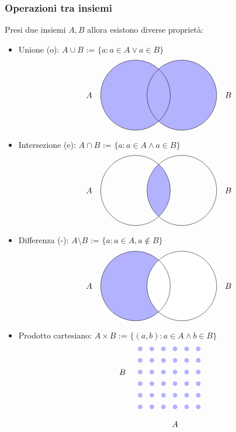 \documentclass[a4paper,12pt]{article}
\begin{document}
	\subsubsection{Operazioni tra insiemi}	
	Presi due insiemi $A, B$ allora esistono diverse proprietà:
	\begin{itemize}
		\item Unione (o): $A \cup B$ := $\{a : a\in A \vee a \in B\}$
		\[
		\begin{tikzpicture}
			
			\begin{scope}
				\clip (0,0) circle (1.5cm);
				\fill[blue!30] (-2,-2) rectangle (4,2);
			\end{scope}
			
			\begin{scope}
				\clip (2,0) circle (1.5cm);
				\fill[blue!30] (-2,-2) rectangle (4,2);
			\end{scope}
			
			\draw (0,0) circle (1.5cm);
			\node at (-2,0) {$A$};
			\draw (2,0) circle (1.5cm);
			\node at (4,0) {$B$};
		\end{tikzpicture}
		\]
		\item Intersezione (e): $A \cap B$ := $\{a : a\in A \wedge a \in B\}$ 
		\[
		\begin{tikzpicture}
			\begin{scope}
				\clip (0,0) circle (1.5cm);
				\fill[blue!30] (2,0) circle (1.5cm);
			\end{scope}
			
			\draw (0,0) circle (1.5cm);
			\node at (-2,0) {$A$};
			\draw (2,0) circle (1.5cm);
			\node at (4,0) {$B$};		
		\end{tikzpicture}
		\]
		\item Differenza (-): $A \setminus B $ :=  $\{a : a \in A, a\not \in B\}$
		\[
		\begin{tikzpicture}
			\begin{scope}
				\clip (0,0) circle (1.5cm);
				\fill[blue!30] (-2,-2) rectangle (2,2);
			\end{scope}
			
			\begin{scope}
				\clip (2,0) circle (1.5cm);
				\fill[white] (-2,-2) rectangle (4,2);
			\end{scope}
			
			
			\draw (0,0) circle (1.5cm);
			\node at (-2,0) {$A$};
			\draw (2,0) circle (1.5cm);
			\node at (4,0) {$B$};	
		\end{tikzpicture}
		\]
		\item Prodotto cartesiano: $A \times B$ := $\{(a, b) : a \in A \wedge b \in B\}$
		\[
		\begin{tikzpicture}
			\foreach \x in {1/2,2/2,3/2,4/2,5/2,6/2} {
				\foreach \y in {1/2,2/2,3/2,4/2,5/2,6/2} {
					\fill[blue!30] (\x,\y) circle (0.1cm);
				}
			}
			
			\node[left] at (0,2) {$B$};
			\node[below] at (2,0) {$A$};
		\end{tikzpicture}
		\]
	\end{itemize}
	
\end{document}
